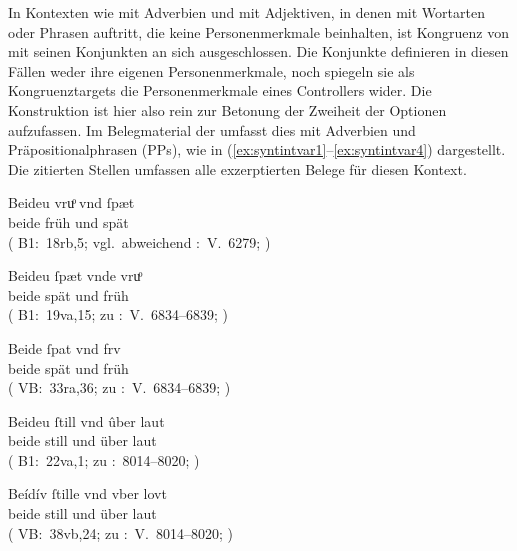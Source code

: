 In Kontexten wie  mit Adverbien und
 mit Adjektiven, in denen  mit Wortarten oder Phrasen auftritt, die keine
Personenmerkmale beinhalten, ist Kongruenz von 
mit seinen Konjunkten an sich ausgeschlossen. Die Konjunkte definieren in
diesen Fällen weder ihre eigenen Personen\-merkmale, noch spiegeln sie als
Kongruenztargets die Personenmerkmale eines Controllers\is{Controller} wider.
Die Konstruktion ist hier also rein zur Betonung der Zweiheit der Optionen
aufzufassen. Im Belegmaterial der \KC{} umfasst dies 
mit Adverbien und Präpositionalphrasen\is{Präpositionalphrase} (PPs), wie in
(\ref{ex:syntintvar1}--\ref{ex:syntintvar4}) dargestellt. Die zitierten Stellen
umfassen alle exzerptierten Belege für diesen Kontext.

\begin{exe}
\ex \label{ex:syntintvar1}
	\begin{xlist}
	\ex \gll Beideu vruͦ vnd ſpæt \\
		beide früh und spät \\
		\trans {}
		(%
			B1:~18rb,5; vgl.~abweichend
			\KC:~V.~6279;
			\cite[196]{schroeder1895}%
		)

	\ex \gll Beideu ſpæt vnde vruͦ \\
		beide spät und früh \\
		\trans {}
		(%
			B1:~19va,15; zu
			\KC:~V.~6834--6839;
			\cite[206]{schroeder1895}%
		)

	\ex \label{ex:syntintvar1_3}
	\gll Beide ſpat vnd frv \\
		beide spät und früh \\
		\trans {}
			(%
				VB:~33ra,36; zu
				\KC:~V.~6834--6839;
				\cite[206]{schroeder1895}%
			)
\end{xlist}

\ex \label{ex:syntintvar3}
	\begin{xlist}
	\ex \gll Beideu ſtill vnd ûber laut \\
		beide still und über laut \\
		\trans {}
			(%
				B1:~22va,1; zu
				\KC:~8014--8020;
				\cite[228]{schroeder1895}%
			)

	\ex \label{ex:syntintvar3_2}
		\gll Beídív ſtille vnd vber lovt \\
		beide still und über laut \\
		\trans {}
			(%
				VB:~38vb,24; zu
				\KC:~V.~8014--8020;
				\cite[228]{schroeder1895}%
			)
\end{xlist}
\end{exe}

